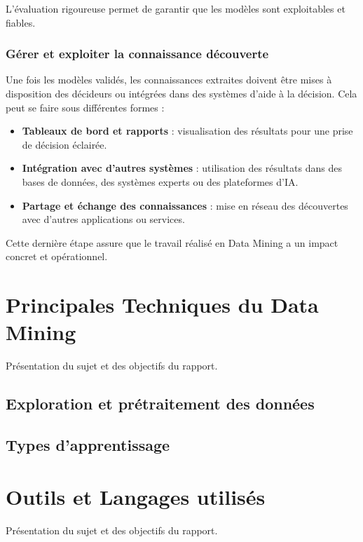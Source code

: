 \documentclass[a4paper,12pt]{report}
\begin{document}
         L’évaluation rigoureuse permet de garantir que les modèles sont exploitables et fiables.    

     \subsection{ Gérer et exploiter la connaissance découverte}
         Une fois les modèles validés, les connaissances extraites doivent être mises à disposition des décideurs ou intégrées dans des systèmes d’aide à la décision. Cela peut se faire sous différentes formes :

         \begin{itemize}
             \item \textbf{Tableaux de bord et rapports} : visualisation des résultats pour une prise de décision éclairée.
        
             \item \textbf{Intégration avec d’autres systèmes} : utilisation des résultats dans des bases de données, des systèmes experts ou des plateformes d’IA.
        
             \item \textbf{Partage et échange des connaissances} : mise en réseau des découvertes avec d’autres applications ou services.
         \end{itemize}
         Cette dernière étape assure que le travail réalisé en Data Mining a un impact concret et opérationnel.
     

\chapter{ Principales Techniques du Data Mining}
Présentation du sujet et des objectifs du rapport.

\section{Exploration et prétraitement des données }

\section{Types d’apprentissage }



\chapter{Outils et Langages utilisés}
Présentation du sujet et des objectifs du rapport.
\end{document}
